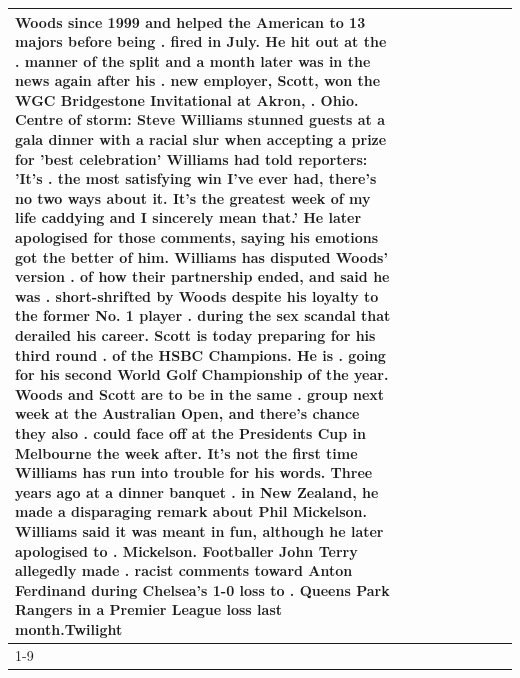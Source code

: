 \begin{table}[H]
\begin{tabular}{lllrlllll}
Woods since 1999 and helped the American to 13 majors before being . fired in July. He hit out at the . manner of the split and a month later was in the news again after his . new employer, Scott, won the WGC Bridgestone Invitational at Akron, . Ohio. Centre of storm: Steve Williams stunned guests at a gala dinner with a racial slur when accepting a prize for 'best celebration' Williams had told reporters: 'It's . the most satisfying win I've ever had, there's no two ways about it. It's the greatest week of my life caddying and I sincerely mean that.' He later apologised for those comments, saying his emotions got the better of him. Williams has disputed Woods' version . of how their partnership ended, and said he was . short-shrifted by Woods despite his loyalty to the former No. 1 player . during the sex scandal that derailed his career. Scott is today preparing for his third round . of the HSBC Champions. He is . going for his second World Golf Championship of the year. Woods and Scott are to be in the same . group next week at the Australian Open, and there's chance they also . could face off at the Presidents Cup in Melbourne the week after. It's not the first time Williams has run into trouble for his words. Three years ago at a dinner banquet . in New Zealand, he made a disparaging remark about Phil Mickelson. Williams said it was meant in fun, although he later apologised to . Mickelson. Footballer John Terry allegedly made . racist comments toward Anton Ferdinand during Chelsea's 1-0 loss to . Queens Park Rangers in a Premier League loss last month.Twilight \\
\cline{1-9}
\bottomrule
\end{tabular}
\end{table}
